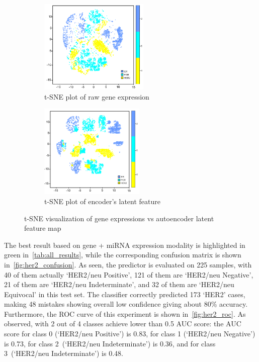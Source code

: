 \begin{figure}[h]
	\centering
	\begin{subfigure}{.48\linewidth}
		\centering
		\includegraphics[width=0.8\linewidth,height=45mm]{images/raw_tsne.png}
		\caption{t-SNE plot of raw gene expression}
        \label{fig:tsne_raw}
	\end{subfigure}
	\begin{subfigure}{0.48\linewidth}
		\centering
		\includegraphics[width=0.8\linewidth,height=45mm]{images/ae_tsne.png}
		\caption{t-SNE plot of encoder's latent feature}
        \label{fig:tsne_ae}
	\end{subfigure}
	 \setlength{\belowcaptionskip}{-8pt}
	\caption{t-SNE visualization of gene expressions vs autoencoder latent feature map~\cite{karimACCESS2019}} 
	\label{fig:tnse}
\end{figure}

\hspace*{3.5mm} The best result based on gene + miRNA expression modality is highlighted in green in~\cref{tab:all_results}, while the corresponding confusion matrix is shown in~\cref{fig:her2_confusion}. As seen, the predictor is evaluated on 225 samples, with 40 of them actually `HER2/neu Positive', 121 of them are `HER2/neu Negative', 21 of them are `HER2/neu Indeterminate', and 32 of them are `HER2/neu Equivocal' in this test set. The classifier correctly predicted 173 `HER2' cases, making 48 mistakes showing overall low confidence giving about 80\% accuracy. Furthermore, the ROC curve of this experiment is shown in~\cref{fig:her2_roc}. As observed, with 2 out of 4 classes achieve lower than 0.5 AUC score: the AUC score for class 0 (`HER2/neu Positive') is 0.83, for class 1 (`HER2/neu Negative') is 0.73, for class 2~(`HER2/neu Indeterminate') is 0.36, and for class 3~(`HER2/neu Indeterminate') is 0.48. 

